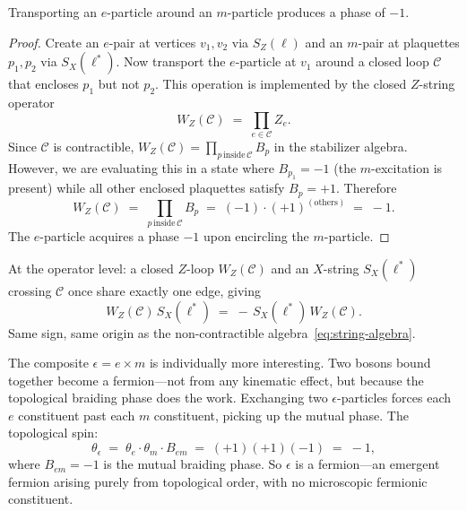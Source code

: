 \begin{proposition}\label{prop:mutual-braiding}
Transporting an $e$-particle around an $m$-particle produces a phase of $-1$.
\end{proposition}
\begin{proof}
Create an $e$-pair at vertices $v_1, v_2$ via $S_Z(\ell)$ and an $m$-pair at plaquettes $p_1, p_2$ via $S_X(\ell^*)$.  Now transport the $e$-particle at $v_1$ around a closed loop $\mathcal{C}$ that encloses $p_1$ but not $p_2$.  This operation is implemented by the closed $Z$-string operator
\begin{equation}\label{eq:closed-z-loop}
    W_Z(\mathcal{C}) \;=\; \prod_{e \in \mathcal{C}} Z_e.
\end{equation}
Since $\mathcal{C}$ is contractible, $W_Z(\mathcal{C}) = \prod_{p\, \text{inside}\, \mathcal{C}} B_p$ in the stabilizer algebra.  However, we are evaluating this in a state where $B_{p_1} = -1$ (the $m$-excitation is present) while all other enclosed plaquettes satisfy $B_p = +1$.  Therefore
\begin{equation}\label{eq:braiding-phase}
    W_Z(\mathcal{C}) \;=\; \prod_{p\, \text{inside}\, \mathcal{C}} B_p \;=\; (-1) \cdot (+1)^{(\text{others})} \;=\; -1.
\end{equation}
The $e$-particle acquires a phase $-1$ upon encircling the $m$-particle.
\end{proof}

\noindent At the operator level: a closed $Z$-loop $W_Z(\mathcal{C})$ and an $X$-string $S_X(\ell^*)$ crossing $\mathcal{C}$ once share exactly one edge, giving
\begin{equation}\label{eq:operator-anticommute}
    W_Z(\mathcal{C})\, S_X(\ell^*) \;=\; -\, S_X(\ell^*)\, W_Z(\mathcal{C}).
\end{equation}
Same sign, same origin as the non-contractible algebra~\eqref{eq:string-algebra}.

The composite $\epsilon = e \times m$ is individually more interesting.  Two bosons bound together become a fermion---not from any kinematic effect, but because the topological braiding phase does the work.  Exchanging two $\epsilon$-particles forces each $e$ constituent past each $m$ constituent, picking up the mutual phase.  The topological spin:
\begin{equation}\label{eq:epsilon-spin}
    \theta_\epsilon \;=\; \theta_e \cdot \theta_m \cdot B_{em} \;=\; (+1)(+1)(-1) \;=\; -1,
\end{equation}
where $B_{em} = -1$ is the mutual braiding phase.  So $\epsilon$ is a fermion---an emergent fermion arising purely from topological order, with no microscopic fermionic constituent.

